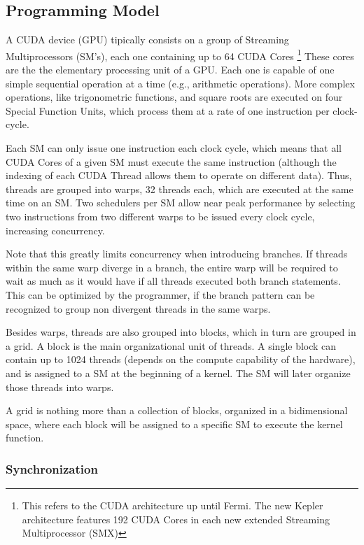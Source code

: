 \subsection{Programming Model}
\label{sec:cuda:model}

A CUDA device (GPU) tipically consists on a group of Streaming Multiprocessors (SM's), each one containing up to 64 CUDA Cores \footnote{This refers to the CUDA architecture up until Fermi. The new Kepler architecture features 192 CUDA Cores in each new extended Streaming Multiprocessor (SMX)}
These cores are the the elementary processing unit of a GPU. Each one is capable of one simple sequential operation at a time (e.g., arithmetic operations). More complex operations, like trigonometric functions, and square roots are executed on four Special Function Units, which process them at a rate of one instruction per clock-cycle.

Each SM can only issue one instruction each clock cycle, which means that all CUDA Cores of a given SM must execute the same instruction (although the indexing of each CUDA Thread allows them to operate on different data). Thus, threads are grouped into warps, 32 threads each, which are executed at the same time on an SM. Two schedulers per SM allow near peak performance by selecting two instructions from two different warps to be issued every clock cycle, increasing concurrency.

Note that this greatly limits concurrency when introducing branches. If threads within the same warp diverge in a branch, the entire warp will be required to wait as much as it would have if all threads executed both branch statements. This can be optimized by the programmer, if the branch pattern can be recognized to group non divergent threads in the same warps.

Besides warps, threads are also grouped into blocks, which in turn are grouped in a grid. A block is the main organizational unit of threads. A single block can contain up to 1024 threads (depends on the compute capability of the hardware), and is assigned to a SM at the beginning of a kernel. The SM will later organize those threads into warps.

A grid is nothing more than a collection of blocks, organized in a bidimensional space, where each block will be assigned to a specific SM to execute the kernel function.

\subsubsection{Synchronization}
\label{sec:cuda:model:sync}

